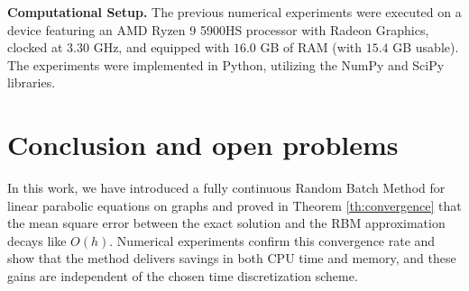 \documentclass[a4paper, 10pt, english]{article}
\begin{document}
\begin{table}[htbp]
\centering
\caption{Performance RBM with $\theta$-method and SIEM, using decomposition \eqref{eq:decompostion2}.}\label{table:rbm_dec2_theta_siem}
\end{table}



\noindent
\textbf{Computational Setup.} The previous numerical experiments were executed on a device featuring an AMD Ryzen 9 5900HS processor with Radeon Graphics, clocked at $3.30$ GHz, and equipped with $16.0$ GB of RAM (with $15.4$ GB usable). The experiments were implemented in Python, utilizing the NumPy and SciPy libraries.


\section{Conclusion and open problems}
In this work, we have introduced a fully continuous Random Batch Method for linear parabolic equations on graphs and proved in Theorem \ref{th:convergence} that the mean square error between the exact solution and the RBM approximation decays like $O(h)$. Numerical experiments confirm this convergence rate and show that the method delivers savings in both CPU time and memory, and these gains are independent of the chosen time discretization scheme.
\end{document}
